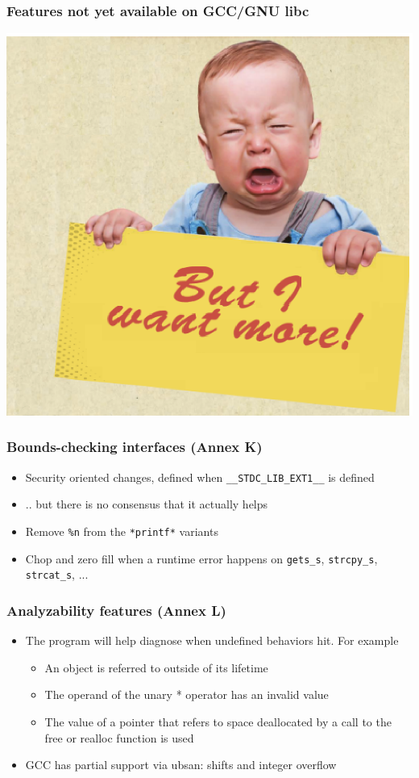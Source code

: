 \documentclass{beamer}
\begin{document}
\begin{frame}
	\frametitle{Features not yet available on GCC/GNU libc}
	\begin{center}
		\includegraphics[scale = 0.6]{more.ps}
	\end{center}
\end{frame}

\begin{frame}
	\frametitle{Bounds-checking interfaces (Annex K)}
	\begin{itemize}
		\item Security oriented changes, defined when \texttt{\_\_STDC\_LIB\_EXT1\_\_} is defined
		\item .. but there is no consensus that it actually helps
		\item Remove \texttt{\%n} from the \texttt{*printf*} variants
		\item Chop and zero fill when a runtime error happens on \texttt{gets\_s}, \texttt{strcpy\_s}, \texttt{strcat\_s}, ...
	\end{itemize}
\end{frame}

\begin{frame}
	\frametitle{Analyzability features (Annex L)}
	\begin{itemize}
		\item The program will help diagnose when undefined behaviors hit. For example
			\begin{itemize}
				\item An object is referred to outside of its lifetime
				\item The operand of the unary * operator has an invalid value
				\item The value of a pointer that refers to space deallocated by a call to the free or realloc function is used
			\end{itemize}
		\item GCC has partial support via ubsan: shifts and integer overflow
	\end{itemize}
\end{frame}
\end{document}
